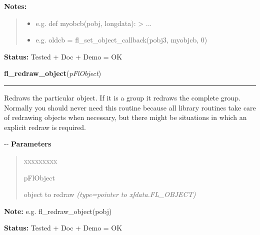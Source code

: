 \begin{boxedminipage}{\funcwidth}
\textbf{Notes:}
\begin{quote}
  \begin{itemize}

  \item
    \setlength{\parskip}{0.6ex}

e.g. def myobcb(pobj, longdata): > ...


  \item 
e.g. oldcb = fl\_set\_object\_callback(pobj3, myobjcb, 0)


\end{itemize}

\end{quote}

\textbf{Status:} 
Tested + Doc + Demo = OK


    \end{boxedminipage}

    \label{xformslib:flbasic:fl_redraw_object}

    \vspace{0.5ex}

\hspace{.8\funcindent}\begin{boxedminipage}{\funcwidth}

    \raggedright \textbf{fl\_redraw\_object}(\textit{pFlObject})

    \vspace{-1.5ex}

    \rule{\textwidth}{0.5\fboxrule}
\setlength{\parskip}{2ex}

Redraws the particular object. If it is a group it redraws the complete
group. Normally you should never need this routine because all library
routines take care of redrawing objects when necessary, but there might be
situations in which an explicit redraw is required.

-{}-
\setlength{\parskip}{1ex}
      \textbf{Parameters}
      \vspace{-1ex}

      \begin{quote}
        \begin{Ventry}{xxxxxxxxx}

          \item[pFlObject]


object to redraw
            {\it (type=pointer to xfdata.FL\_OBJECT)}

        \end{Ventry}

      \end{quote}

\textbf{Note:} 
e.g. fl\_redraw\_object(pobj)


\textbf{Status:} 
Tested + Doc + Demo = OK


    \end{boxedminipage}

